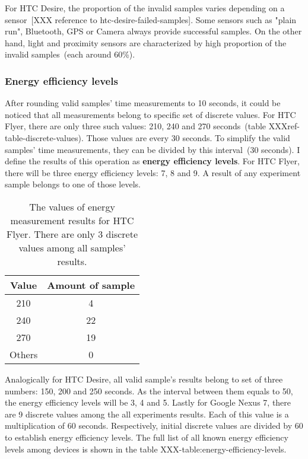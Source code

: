 
For HTC Desire, the proportion of the invalid samples varies depending on a sensor\ [XXX reference to htc-desire-failed-samples]. Some sensors such as "plain run", Bluetooth, GPS or Camera always provide successful samples. On the other hand, light and proximity sensors are characterized by high proportion of the invalid samples\ (each around 60\%). 



\subsubsection{Energy efficiency levels}
After rounding valid samples' time measurements to 10 seconds, it could be noticed that all measurements belong to specific set of discrete values. For HTC Flyer, there are only three such values: 210, 240 and 270 seconds\ (table XXXref-table-discrete-values). Those values are every 30 seconds. To simplify the valid samples' time measurements, they can be divided by this interval\ (30 seconds). I define the results of this operation as \textbf{energy efficiency levels}. For HTC Flyer, there will be three energy efficiency levels: 7, 8 and 9. A result of any experiment sample belongs to one of those levels. 
			
\begin{table}[H]
\centering
    \begin{tabular}{| c | c |}
    \hline
    	Value & Amount of sample \\ \hline
    	210 & 4 \\ \hline
    	240 & 22 \\ \hline
    	270 & 19 \\ \hline
    	Others & 0 \\ \hline
    \end{tabular}
    \caption{The values of energy measurement results for HTC Flyer. There are only 3 discrete values among all samples' results.}
	\label{table:discretevalues}
\end{table}
			
Analogically for HTC Desire, all valid sample's results belong to set of three numbers: 150, 200 and 250 seconds. As the interval between them equals to 50, the energy efficiency levels will be 3, 4 and 5. Lastly for Google Nexus 7, there are 9 discrete values among the all experiments results. Each of this value is a multiplication of 60 seconds. Respectively, initial discrete values are divided by 60 to establish energy efficiency levels. The full list of all known energy efficiency levels among devices is shown in the table XXX-table:energy-efficiency-levels.
		
